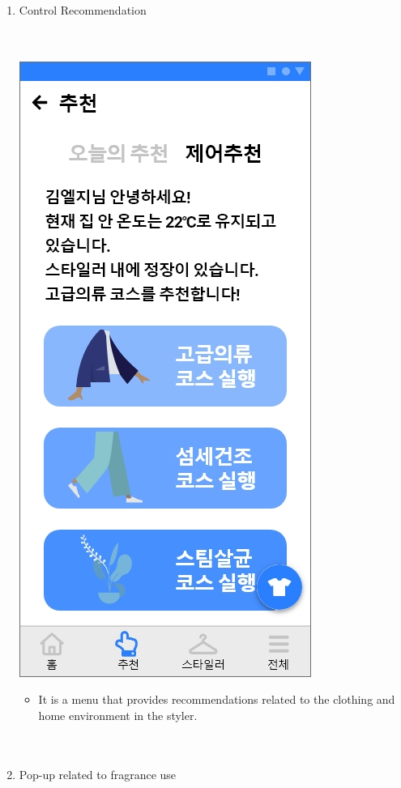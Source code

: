 \documentclass[conference]{IEEEtran}
\begin{document}
\begin{enumerate}
\begin{itemize}
\end{itemize}
       \item Control Recommendation \\ \\ \\
       \centerline{\includegraphics[scale=0.32]{추천3.jpg}}
       \break
           \begin{itemize}
    \item[] It is a menu that provides recommendations related to the clothing and home environment in the styler.\\\\\\
\end{itemize}
     \item Pop-up related to fragrance use \\ \\

\end{enumerate}
\end{document}

